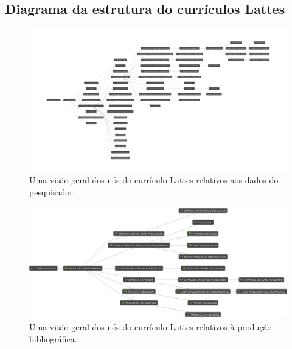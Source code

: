 
\begin{apendicesenv}

\partapendices

\chapter{Diagrama da estrutura do currículos Lattes}
\label{ap:diagramacurriculo}

\begin{figure}[htpb]
  \centering
  \includegraphics[width=1\textwidth]{figuras/diagrama-curriculo-dados-gerais}
  \caption{Uma visão geral dos nós do currículo Lattes relativos aos dados do pesquisador.}
  \label{fig:diagramadadosgerais}
\end{figure}

\begin{figure}[htpb]
  \centering
  \includegraphics[width=1\textwidth]{figuras/diagrama-curriculo-producao-bibliografica}
  \caption{Uma visão geral dos nós do currículo Lattes relativos à produção bibliográfica.}
  \label{fig:diagramaproducaobibliografica}
\end{figure}


\end{apendicesenv}
